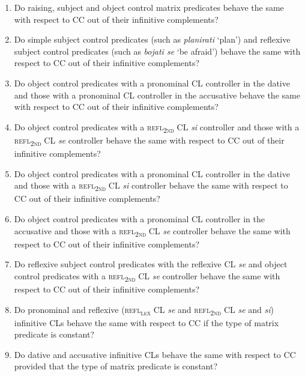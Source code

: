 \begin{enumerate}[label=RQ\arabic*:,ref=RQ\arabic*]
\item\label{RQ1} Do raising, subject and object control matrix predicates behave the same with respect to CC out of their infinitive complements?
\item\label{RQ2} Do simple subject control predicates (such as \textit{planirati} ‘plan’) and reflexive subject control predicates (such as \textit{bojati se} ‘be afraid’) behave the same with respect to CC out of their infinitive complements?
\item\label{RQ3} Do object control predicates with a pronominal CL controller in the dative and those with a pronominal CL controller in the accusative behave the same with respect to CC out of their infinitive complements?
\item\label{RQ4} Do object control predicates with a \textsc{refl\textsubscript{2nd}} CL \textit{si} controller and those with a \textsc{refl\textsubscript{2nd}} CL \textit{se} controller behave the same with respect to CC out of their infinitive complements?
\item\label{RQ5} Do object control predicates with a pronominal CL controller in the dative and those with a \textsc{refl\textsubscript{2nd}} CL \textit{si} controller behave the same with respect to CC out of their infinitive complements? 
\item\label{RQ6} Do object control predicates with a pronominal CL controller in the accusative and those with a \textsc{refl\textsubscript{2nd}} CL \textit{se} controller behave the same with respect to CC out of their infinitive complements? 
\item\label{RQ7} Do reflexive subject control predicates with the reflexive CL \textit{se} and object control predicates with a \textsc{refl\textsubscript{2nd}} CL \textit{se} controller behave the same with respect to CC out of their infinitive complements? 
\item\label{RQ8} Do pronominal and reflexive (\textsc{refl\textsubscript{\textsc{lex}}} CL \textit{se} and \textsc{refl\textsubscript{2nd}} CL \textit{se} and \textit{si}) infinitive CLs behave the same with respect to CC if the type of matrix predicate is constant? 
\item\label{RQ9} Do dative and accusative infinitive CLs behave the same with respect to CC provided that the type of matrix predicate is constant? 
\end{enumerate}

